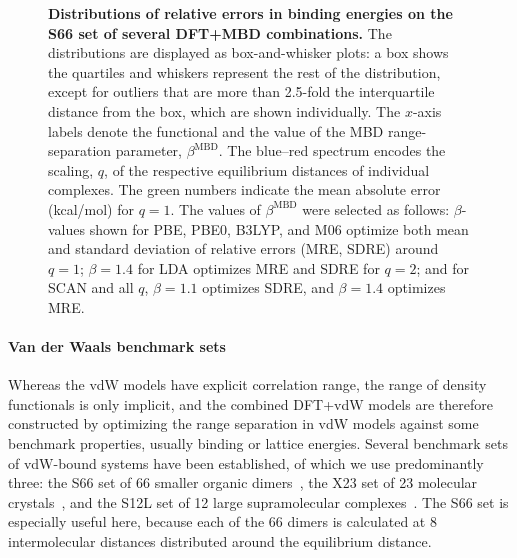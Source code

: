 \begin{figure}[t!]
\caption{\textbf{Distributions of relative errors in binding energies on the S66 set of several DFT+MBD combinations.}
The distributions are displayed as box-and-whisker plots: a box shows the quartiles and whiskers represent the rest of the distribution, except for outliers that are more than 2.5-fold the interquartile distance from the box, which are shown individually.
The $x$-axis labels denote the functional and the value of the MBD range-separation parameter, $\beta^\text{MBD}$.
The blue--red spectrum encodes the scaling, $q$, of the respective equilibrium distances of individual complexes.
The green numbers indicate the mean absolute error (kcal/mol) for $q=1$.
The values of $\beta^\text{MBD}$ were selected as follows: $\beta$-values shown for PBE, PBE0, B3LYP, and M06 optimize both mean and standard deviation of relative errors (MRE, SDRE) around $q=1$; $\beta=1.4$ for LDA optimizes MRE and SDRE for $q=2$; and for SCAN and all $q$, $\beta=1.1$ optimizes SDRE, and $\beta=1.4$ optimizes MRE\@.
}\label{fig:s66-dists}
\end{figure}

\paragraph{Van der Waals benchmark sets}

Whereas the vdW models have explicit correlation range, the range of density functionals is only implicit, and the combined DFT+vdW models are therefore constructed by optimizing the range separation in vdW models against some benchmark properties, usually binding or lattice energies.
Several benchmark sets of vdW-bound systems have been established, of which we use predominantly three: the S66 set of 66 smaller organic dimers~\cite{RezacJCTC11}, the X23 set of 23 molecular crystals~\cite{ReillyJCP13}, and the S12L set of 12 large supramolecular complexes~\cite{RisthausJCTC13,AmbrosettiJPCL14}.
The S66 set is especially useful here, because each of the 66 dimers is calculated at 8 intermolecular distances distributed around the equilibrium distance.

